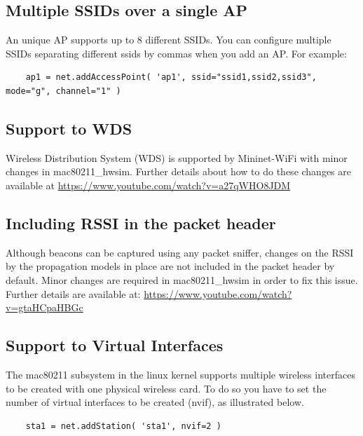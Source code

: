 
\subsection{Multiple SSIDs over a single AP}
An unique AP supports up to 8 different SSIDs. You can configure multiple SSIDs separating different ssids by commas when you add an AP. For example:

\begin{verbatim}
    ap1 = net.addAccessPoint( 'ap1', ssid="ssid1,ssid2,ssid3", mode="g", channel="1" )
\end{verbatim}

\subsection{Support to WDS}
Wireless Distribution System (WDS) is supported by Mininet-WiFi with minor changes in mac80211\_hwsim. Further details about how to do these changes are available at \url{https://www.youtube.com/watch?v=a27qWHO8JDM}

\subsection{Including RSSI in the packet header}
Although beacons can be captured using any packet sniffer, changes on the RSSI by the propagation models in place are
not included in the packet header by default. Minor changes are required in mac80211\_hwsim in order to fix this issue. Further details are available at: \url{https://www.youtube.com/watch?v=gtaHCpaHBGc}

\subsection{Support to Virtual Interfaces}

The mac80211 subsystem in the linux kernel supports multiple wireless interfaces to be created with one physical wireless card. To do so you have to set the number of virtual interfaces to be created (nvif), as illustrated below.

\begin{verbatim}
    sta1 = net.addStation( 'sta1', nvif=2 )
\end{verbatim}




